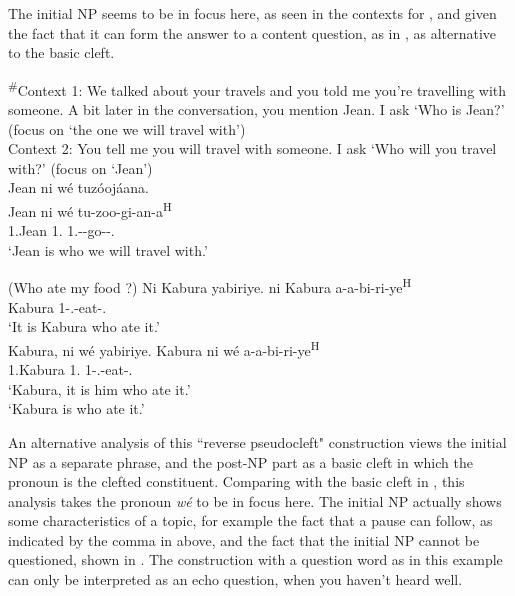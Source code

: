 \documentclass[output=paper]{langscibook}
\begin{document}
\z

The initial NP seems to be in focus here, as seen in the contexts for , and given the fact that it can form the answer to a content question, as in , as alternative to the basic cleft.

\ea
\label{bkm:Ref118967248}
\textsuperscript{\#}Context 1: We talked about your travels and you told me you’re travelling with someone. A bit later in the conversation, you mention Jean. I ask ‘Who is Jean?’ (focus on ‘the one we will travel with’)\\
Context 2: You tell me you will travel with someone. I ask ‘Who will you travel with?’ (focus on ‘Jean’)\\
Jean ni wé tuzóojáana.\\
\gll
Jean  ni  wé  tu-zoo-gi-an-a\textsuperscript{H}\\
1.Jean  \COP{}  1.\PRO{}  1\PL.\SM-\FUT{}-go-\ASS{}-\FV.\REL{}\\
\glt
‘Jean is who we will travel with.’\\

\z
\pagebreak

\ea
\label{bkm:Ref78803230}(Who ate my food ?)
\ea
\label{bkm:Ref78803230:a}
Ni Kabura yabiriye.  
\gll
ni  Kabura  a-a-bi-ri-ye\textsuperscript{H}\\
\COP{}  Kabura  1\SM{}-\N.\OM{}-eat-\PFV.\REL{}\\
\glt
‘It is Kabura who ate it.’\\

\ex
\label{bkm:Ref78803230:b}
Kabura, ni wé yabiriye.  
\gll
Kabura  ni  wé  a-a-bi-ri-ye\textsuperscript{H}\\
1.Kabura  \COP{}  1.\PRO{}  1\SM-\N.\OM{}-eat-\PFV.\REL{}\\
\glt
‘Kabura, it is him who ate it.’\\
‘Kabura is who ate it.’


\z
\z

An alternative analysis of this ``reverse pseudocleft" construction views the initial NP as a separate phrase, and the post-NP part as a basic cleft in which the pronoun is the clefted constituent. Comparing  with the basic cleft in , this analysis takes the pronoun \textit{wé} to be in focus here. The initial NP actually shows some characteristics of a topic, for example the fact that a pause can follow, as indicated by the comma in  above, and the fact that the initial NP cannot be questioned, shown in . The construction with a question word as in this example can only be interpreted as an echo question, when you haven’t heard well.
\end{document}

